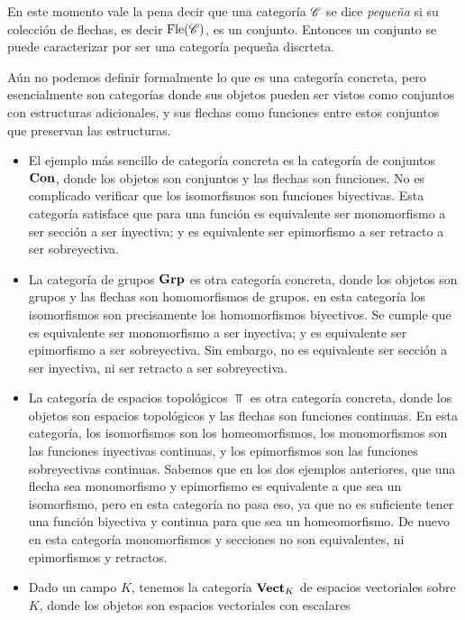 \documentclass{comunicaciones}
\begin{document}
En este momento vale la pena decir que una categoría $\mathscr C$ se dice \emph{pequeña} si su colección de flechas, es decir $\mathrm{Fle}(\mathscr C)$, es un conjunto. Entonces un
conjunto se puede caracterizar por ser una categoría pequeña discrteta.

\begin{ej}\label{Categorías concretas}
    Aún no podemos definir formalmente lo que es una categoría concreta, pero esencialmente son categorías donde sus objetos pueden ser vistos como conjuntos
    con estructuras adicionales, y sus flechas como funciones entre estos conjuntos que preservan las estructuras.
    \begin{itemize}
        \item El ejemplo más sencillo de categoría concreta es la categoría de conjuntos $\mathbf{Con}$, donde los objetos son conjuntos y las flechas son funciones.
        No es complicado verificar que los isomorfismos son funciones biyectivas. Esta categoría satisface que para una función es equivalente ser monomorfismo a
        ser sección a ser inyectiva; y es equivalente ser epimorfismo a ser retracto a ser sobreyectiva.
        \item La categoría de grupos $\mathbf{Grp}$ es otra categoría concreta, donde los objetos son grupos y las flechas son homomorfismos de grupos. en esta categoría
        los isomorfismos son precisamente los homomorfismos biyectivos. Se cumple que es equivalente ser monomorfismo a ser inyectiva; y es equivalente ser
        epimorfismo a ser sobreyectiva. Sin embargo, no es equivalente ser sección a ser inyectiva, ni ser retracto a ser sobreyectiva.
        \item La categoría de espacios topológicos $\Top$ es otra categoría concreta, donde los objetos son espacios topológicos y las flechas son funciones
        continuas. En esta categoría, los isomorfismos son los homeomorfismos, los monomorfismos son las funciones inyectivas continuas, y los epimorfismos
        son las funciones sobreyectivas continuas. Sabemos que en los dos ejemplos anteriores, que una flecha sea monomorfismo y epimorfismo es equivalente
        a que sea un isomorfismo, pero en esta categoría no pasa eso, ya que no es suficiente tener una función biyectiva y continua para que sea un 
        homeomorfismo. De nuevo en esta categoría monomorfismos y secciones no son equivalentes, ni epimorfismos y retractos. 
        \item Dado un campo $K$, tenemos la categoría $\mathbf{Vect}_K$ de espacios vectoriales sobre $K$, donde los objetos son espacios vectoriales con escalares

\end{itemize}
\end{ej}
\end{document}
